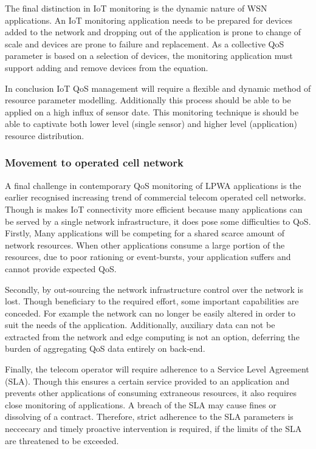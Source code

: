 The final distinction in IoT monitoring is the dynamic nature of WSN applications. An IoT monitoring application needs to be prepared for devices added to the network and dropping out of the application is prone to change of scale and devices are prone to failure and replacement. As a collective QoS parameter is based on a selection of devices, the monitoring application must support adding and remove devices from the equation.

In conclusion IoT QoS management will require a flexible and dynamic method of resource parameter modelling. Additionally this process should be able to be applied on a high influx of sensor date. This monitoring technique is should be able to captivate both lower level (single sensor) and higher level (application) resource distribution.

\subsubsection{Movement to operated cell network}
A final challenge in contemporary QoS monitoring of LPWA applications is the earlier recognised increasing trend of commercial telecom operated cell networks. Though is makes IoT connectivity more efficient because many applications can be served by a single network infrastructure, it does pose some difficulties to QoS. Firstly, Many applications will be competing for a shared scarce amount of network resources. When other applications consume a large portion of the resources, due to poor rationing or event-bursts, your application suffers and cannot provide expected QoS.

Secondly, by out-sourcing the network infrastructure control over the network is lost. Though beneficiary to the required effort, some important capabilities are conceded. For example the network can no longer be easily altered in order to suit the needs of the application. Additionally, auxiliary data can not be extracted from the network and edge computing is not an option, deferring the burden of aggregating QoS data entirely on back-end.

Finally, the telecom operator will require adherence to a Service Level Agreement (SLA). Though this ensures a certain service provided to an application and prevents other applications of consuming extraneous resources, it also requires close monitoring of applications. A breach of the SLA may cause fines or dissolving of a contract. Therefore, strict adherence to the SLA parameters is neccecary and timely proactive intervention is required, if the limits of the SLA are threatened to be exceeded. \cite{zoek refs in rtopics}

